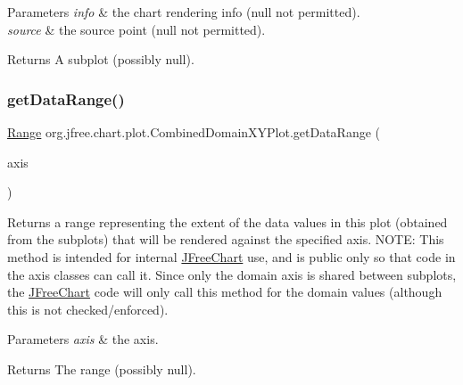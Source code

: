 \begin{DoxyParams}{Parameters}
{\em info} & the chart rendering info ({\ttfamily null} not permitted). \\
\hline
{\em source} & the source point ({\ttfamily null} not permitted).\\
\hline
\end{DoxyParams}
\begin{DoxyReturn}{Returns}
A subplot (possibly {\ttfamily null}). 
\end{DoxyReturn}
\mbox{\label{classorg_1_1jfree_1_1chart_1_1plot_1_1_combined_domain_x_y_plot_a523053d6ce39485c79245c4a1bc12ed0}} 
\subsubsection{\texorpdfstring{get\+Data\+Range()}{getDataRange()}}
{\footnotesize\ttfamily \mbox{\hyperlink{classorg_1_1jfree_1_1data_1_1_range}{Range}} org.\+jfree.\+chart.\+plot.\+Combined\+Domain\+X\+Y\+Plot.\+get\+Data\+Range (\begin{DoxyParamCaption}\item[{\mbox{\hyperlink{classorg_1_1jfree_1_1chart_1_1axis_1_1_value_axis}{Value\+Axis}}}]{axis }\end{DoxyParamCaption})}

Returns a range representing the extent of the data values in this plot (obtained from the subplots) that will be rendered against the specified axis. N\+O\+TE\+: This method is intended for internal \mbox{\hyperlink{classorg_1_1jfree_1_1chart_1_1_j_free_chart}{J\+Free\+Chart}} use, and is public only so that code in the axis classes can call it. Since only the domain axis is shared between subplots, the \mbox{\hyperlink{classorg_1_1jfree_1_1chart_1_1_j_free_chart}{J\+Free\+Chart}} code will only call this method for the domain values (although this is not checked/enforced).


\begin{DoxyParams}{Parameters}
{\em axis} & the axis.\\
\hline
\end{DoxyParams}
\begin{DoxyReturn}{Returns}
The range (possibly {\ttfamily null}). 
\end{DoxyReturn}


